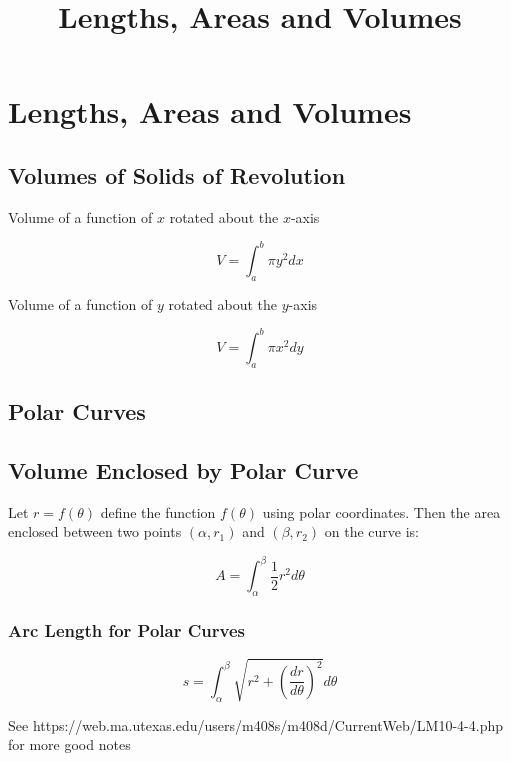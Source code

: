 \documentclass{article}
\title{Lengths, Areas and Volumes}
\begin{document}
\section{Lengths, Areas and Volumes}

\subsection{Volumes of Solids of Revolution}

Volume of a function of $x$ rotated about the $x$-axis

\[ V = \int_a^b{\pi y^2}dx \]

Volume of a function of $y$ rotated about the $y$-axis

\[ V = \int_a^b{\pi x^2}dy \]

\subsection{Polar Curves}

\subsection{Volume Enclosed by Polar Curve}

Let $r = f(\theta)$ define the function $f(\theta)$ using polar coordinates. Then the area enclosed between two points $(\alpha, r_1)$ and $(\beta, r_2)$ on the curve is:

\[ A = \int_{\alpha}^{\beta} \frac{1}{2} r^2 d\theta \]

\subsubsection{Arc Length for Polar Curves}

\[ s = \int_{\alpha}^{\beta} \sqrt{r^2 + (\frac{dr}{d\theta})^2}d\theta \]

See https://web.ma.utexas.edu/users/m408s/m408d/CurrentWeb/LM10-4-4.php for more good notes
\end{document}
